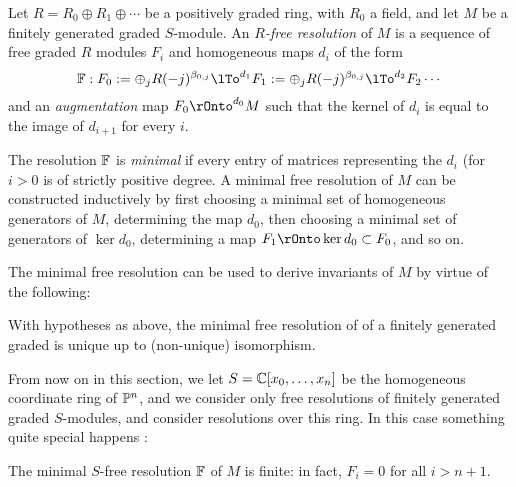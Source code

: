 Let 
$R = R_{0} \oplus R_{1}\oplus\cdots$ be a positively graded ring, with $R_{0}$ a field,
 and let $M$ be a finitely generated graded $S$-module. An  \emph{$R$-free resolution} of $M$ is a sequence of free graded $R$ modules $F_{i}$ and homogeneous maps $d_{i}$ of the form
$$
\FF: F_{0}:=\oplus_{j}R(-j)^{\beta_{0,j}} \lTo^{d_{1}} F_{1}:=\oplus_{j}R(-j)^{\beta_{0,j}}\lTo^{d_{2}} F_{2}\cdots
$$
and an \emph{augmentation} map $F_{0} \rOnto^{d_{0}} M$ such that the kernel of $d_{i}$ is equal to the image of $d_{i+1}$ for every $i$. 

The resolution $\FF$ is \emph{minimal} if every entry of matrices representing the $d_{i}$ (for $i>0$ is of strictly positive degree. A minimal free resolution of $M$ can be constructed inductively by first choosing a minimal set of homogeneous generators of $M$, determining the map $d_{0}$, then choosing a minimal set of generators of $\ker d_{0}$, determining a map
$F_{1} \rOnto \ker d_{0} \subset F_{0}$, and so on.

The minimal free resolution can be used to derive invariants of $M$
\cite[Theorem ***]{E} by virtue of the following:

\begin{theorem}[Uniqueness]\label{uniqueness} With hypotheses as above, the minimal free resolution of of a finitely generated graded is unique up to (non-unique) isomorphism.
\end{theorem}

From now on in this section, we let $S = \CC[x_{0},\dots, x_{n}]$ be the homogeneous coordinate ring of $\PP^{n}$, and we consider only free resolutions of finitely generated graded $S$-modules, and consider resolutions over this ring. In this case something quite special happens \cite[****]{E}:

\begin{theorem}\label{hst}
The minimal $S$-free resolution $\FF$ of $M$ is finite: in fact, $F_{i}=0$ for all $i>n+1$.
\end{theorem}

